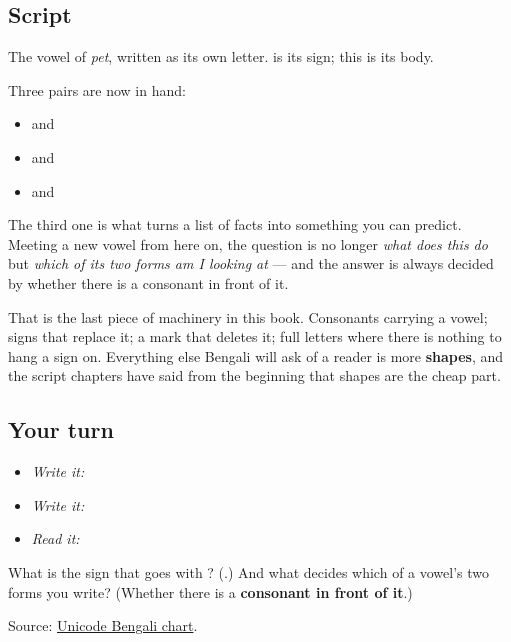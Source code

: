 \subsection*{Script}
\begin{quote}
\end{quote}

The vowel of \emph{pet}, written as its own letter. \textbf{} is its sign; this is its body.

Three pairs are now in hand:

\begin{itemize}
\raggedright
  \item \textbf{} and \textbf{}
  \item \textbf{} and \textbf{}
  \item \textbf{} and \textbf{}
\end{itemize}

The third one is what turns a list of facts into something you can predict. Meeting a new vowel from here on, the question is no longer \emph{what does this do} but \emph{which of its two forms am I looking at} — and the answer is always decided by whether there is a consonant in front of it.

That is the last piece of machinery in this book. Consonants carrying a vowel; signs that replace it; a mark that deletes it; full letters where there is nothing to hang a sign on. Everything else Bengali will ask of a reader is more \textbf{shapes}, and the script chapters have said from the beginning that shapes are the cheap part.

\subsection*{Your turn}
\begin{itemize}
\raggedright
  \item \emph{Write it:} 
  \item \emph{Write it:}   
  \item \emph{Read it:} 
\end{itemize}

\begin{tcolorbox}[breakable,colback=teal!4,colframe=teal!35!black,title={Before you move on}]
What is the sign that goes with \textbf{}? (\textbf{}.) And what decides which of a vowel's two forms you write? (Whether there is a \textbf{consonant in front of it}.)

Source: \href{https://www.unicode.org/charts/PDF/U0980.pdf}{Unicode Bengali chart}.
\end{tcolorbox}

